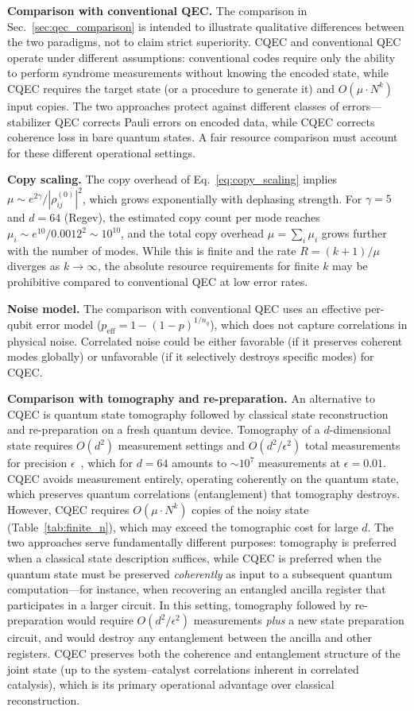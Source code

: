 \documentclass[prx,twocolumn,superscriptaddress,longbibliography,floatfix]{revtex4-2}
\begin{document}
\textbf{Comparison with conventional QEC.}
The comparison in Sec.~\ref{sec:qec_comparison} is intended to illustrate qualitative differences between the two paradigms, not to claim strict superiority.
CQEC and conventional QEC operate under different assumptions: conventional codes require only the ability to perform syndrome measurements without knowing the encoded state, while CQEC requires the target state (or a procedure to generate it) and $O(\mu \cdot N^k)$ input copies.
The two approaches protect against different classes of errors---stabilizer QEC corrects Pauli errors on encoded data, while CQEC corrects coherence loss in bare quantum states.
A fair resource comparison must account for these different operational settings.

\textbf{Copy scaling.}
The copy overhead of Eq.~\eqref{eq:copy_scaling} implies $\mu \sim e^{2\gamma}/|\rho_{ij}^{(0)}|^2$, which grows exponentially with dephasing strength.
For $\gamma = 5$ and $d = 64$ (Regev), the estimated copy count per mode reaches $\mu_i \sim e^{10}/0.0012^2 \sim 10^{10}$, and the total copy overhead $\mu = \sum_i \mu_i$ grows further with the number of modes.
While this is finite and the rate $R = (k+1)/\mu$ diverges as $k \to \infty$, the absolute resource requirements for finite $k$ may be prohibitive compared to conventional QEC at low error rates.

\textbf{Noise model.}
The comparison with conventional QEC uses an effective per-qubit error model ($p_\mathrm{eff} = 1 - (1-p)^{1/n_q}$), which does not capture correlations in physical noise.
Correlated noise could be either favorable (if it preserves coherent modes globally) or unfavorable (if it selectively destroys specific modes) for CQEC.

\textbf{Comparison with tomography and re-preparation.}
An alternative to CQEC is quantum state tomography followed by classical state reconstruction and re-preparation on a fresh quantum device.
Tomography of a $d$-dimensional state requires $O(d^2)$ measurement settings and $O(d^2/\epsilon^2)$ total measurements for precision $\epsilon$~\cite{NielsenChuang2010}, which for $d = 64$ amounts to $\sim 10^7$ measurements at $\epsilon = 0.01$.
CQEC avoids measurement entirely, operating coherently on the quantum state, which preserves quantum correlations (entanglement) that tomography destroys.
However, CQEC requires $O(\mu \cdot N^k)$ copies of the noisy state (Table~\ref{tab:finite_n}), which may exceed the tomographic cost for large $d$.
The two approaches serve fundamentally different purposes: tomography is preferred when a classical state description suffices, while CQEC is preferred when the quantum state must be preserved \emph{coherently} as input to a subsequent quantum computation---for instance, when recovering an entangled ancilla register that participates in a larger circuit.
In this setting, tomography followed by re-preparation would require $O(d^2/\epsilon^2)$ measurements \emph{plus} a new state preparation circuit, and would destroy any entanglement between the ancilla and other registers.
CQEC preserves both the coherence and entanglement structure of the joint state (up to the system--catalyst correlations inherent in correlated catalysis), which is its primary operational advantage over classical reconstruction.
\end{document}
